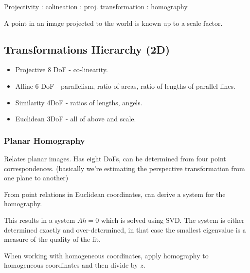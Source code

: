 Projectivity : colineation :  proj. transformation : homography

A point in an image projected to the world is known up to a scale factor.

\subsection{Transformations Hierarchy (2D)}

\begin{itemize}
\item Projective 8 DoF - co-linearity.
\item Affine 6 DoF - parallelism, ratio of areas, ratio of lengths of parallel lines.
\item Similarity 4DoF - ratios of lengths, angels.
\item Euclidean 3DoF - all of above and scale.
\end{itemize}



\subsubsection{Planar Homography}

Relates planar images. Has eight DoFs, can be determined from four point correspondences.
(basically we're estimating the perspective transformation from one plane to another)

From point relations in Euclidean coordinates, can derive a system for the homography. 

This results in a system $Ah = 0$ which is solved using SVD. 
The system is either determined exactly and over-determined, in that case the smallest eigenvalue is a measure of the quality of the fit.

When working with homogeneous coordinates, apply homography to homogeneous coordinates and then divide by $z$.


